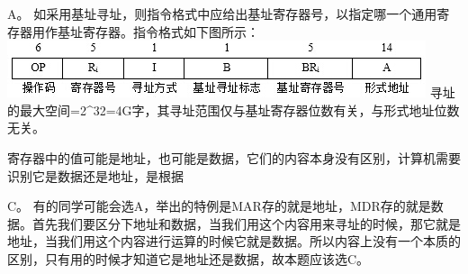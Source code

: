 \begin{solution}A。
如采用基址寻址，则指令格式中应给出基址寄存器号，以指定哪一个通用寄存器用作基址寄存器。指令格式如下图所示：
\includegraphics[width=4.84375in,height=0.65625in]{computerassets/7abb2d9c3bbfc12cb302dfa8413e1155.jpeg}
寻址的最大空间=2\^{}32=4G字，其寻址范围仅与基址寄存器位数有关，与形式地址位数无关。
\end{solution}
\question 寄存器中的值可能是地址，也可能是数据，它们的内容本身没有区别，计算机需要识别它是数据还是地址，是根据
\par{}
\begin{solution}C。
有的同学可能会选A，举出的特例是MAR存的就是地址，MDR存的就是数据。首先我们要区分下地址和数据，当我们用这个内容用来寻址的时候，那它就是地址，当我们用这个内容进行运算的时候它就是数据。所以内容上没有一个本质的区别，只有用的时候才知道它是地址还是数据，故本题应该选C。
\end{solution}
